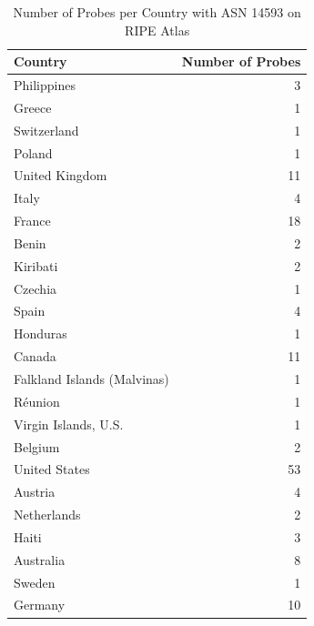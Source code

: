 \begin{table}
	\caption{Number of Probes per Country with ASN 14593 on RIPE Atlas}
	\label{fig:probes-per-country}
	\begin{tabular}{lr}
		\toprule
		Country                     & Number of Probes \\
		\midrule
		Philippines                 & 3                \\
		Greece                      & 1                \\
		Switzerland                 & 1                \\
		Poland                      & 1                \\
		United Kingdom              & 11               \\
		Italy                       & 4                \\
		France                      & 18               \\
		Benin                       & 2                \\
		Kiribati                    & 2                \\
		Czechia                     & 1                \\
		Spain                       & 4                \\
		Honduras                    & 1                \\
		Canada                      & 11               \\
		Falkland Islands (Malvinas) & 1                \\
		Réunion                     & 1                \\
		Virgin Islands, U.S.        & 1                \\
		Belgium                     & 2                \\
		United States               & 53               \\
		Austria                     & 4                \\
		Netherlands                 & 2                \\
		Haiti                       & 3                \\
		Australia                   & 8                \\
		Sweden                      & 1                \\
		Germany                     & 10               \\
		\bottomrule
	\end{tabular}
\end{table}


